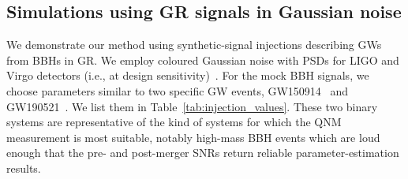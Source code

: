 \subsection{Simulations using GR signals in Gaussian noise} \label{ssec:gr_signal}

We  demonstrate our method using synthetic-signal injections describing GWs
from BBHs in GR. We employ coloured Gaussian noise with PSDs for LIGO and
Virgo detectors  (i.e., at design sensitivity)~\cite{AdvLIGOPSD,TheVirgo:2014hva}.
For the mock BBH signals, we choose parameters similar to two specific GW events, GW150914~\cite{Abbott:2016blz} and
GW190521~\cite{Abbott:2020tfl}. We list them in Table~\ref{tab:injection_values}.
These two binary systems are representative of the kind of systems for which
the QNM measurement is most suitable, notably high-mass BBH events which are loud enough that the
pre- and post-merger SNRs return reliable parameter-estimation results.




